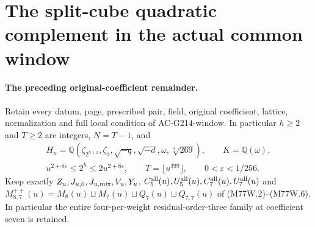 \section{The split-cube quadratic complement in the actual common window}
\label{sec:mixed-cubic-split-cube-window}

\paragraph{The preceding original-coefficient remainder.}
Retain every datum, page, prescribed pair, field, original coefficient,
lattice, normalization and full local condition of AC-G214-window.
In particular $h\geq2$ and $T\geq2$ are integers, $N=T-1$, and
\[
 \begin{gathered}
 H_u=\mathbb Q(\zeta_{2^{h+2}},\zeta_7,\sqrt{-q},\sqrt{-d},
                   \omega,\sqrt[3]{269}),\qquad K=\mathbb Q(\omega),\\
 u^{2+8\varepsilon}\leq2^h\leq2u^{2+8\varepsilon},\qquad
 T=\lfloor u^{399}\rfloor,\qquad0<\varepsilon<1/256.
 \end{gathered}\tag{MCNW.1}
\]
Keep exactly $Z_u,J_{u,0},J_{u,\rm mix},V_u,Y_u$,
$C_5^{\rm all}(u),U_5^{\rm all}(u),C_7^{\rm all}(u),U_7^{\rm all}(u)$
and $M_{8,7}^{++}(u)=M_8(u)\sqcup M_7(u)\sqcup Q_7(u)\sqcup Q_{7,7}(u)$
of (M77W.2)--(M77W.6). In particular the entire four-per-weight
residual-order-three family at coefficient seven is retained.

